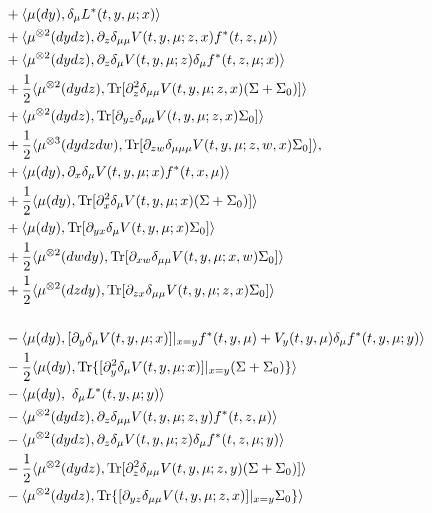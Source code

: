 \documentclass{amsart}
\theoremstyle{definition}
\theoremstyle{remark}
\def\D{\partial}
\numberwithin{equation}{section}
\begin{document}
{\begin{align*}
& + \langle \mu(dy), \delta_\mu L^*(t,y,  \mu;x) \rangle \notag \\
& +\langle \mu^{\otimes2}(dydz), \D_z\delta_{\mu\mu} V(t,y, \mu; z,x) f^*(t, z,\mu)\rangle \notag  \\
&+\langle  \mu^{\otimes2}(dydz), \D_z\delta_\mu V(t,y, \mu; z)\delta_\mu f^*(t, z,\mu;x)\rangle \notag  \\
&\hskip -0cm +\frac{1}{2}\langle  \mu^{\otimes2}(dydz), {\rm Tr}[
\D_{z}^2 \delta_{\mu\mu}
V(t, y, \mu; z,x) (\Sigma+\Sigma_0)]\rangle \notag \\
&+ \langle \mu^{\otimes2}(dydz), {\rm Tr} [ \D_{yz}\delta_{\mu\mu} V(t,y, \mu;z,x)  \Sigma_0]\rangle \notag  \\
&+\frac{1}{2}\langle\mu^{\otimes3}(dydzdw), {\rm Tr}[\D_{zw}\delta_{\mu\mu\mu} V (t, y, \mu; z,w,x)
\Sigma_0]\rangle ,\notag\\
&+\langle\mu(dy), \D_x\delta_\mu V(t,y, \mu; x) f^*(t, x,\mu)\rangle \\
& + \frac{1}{2}\langle\mu(dy), {\rm Tr}[
\D_{x}^2 \delta_\mu
V(t, y, \mu; x) (\Sigma+\Sigma_0)]\rangle \\
&+\langle\mu(dy),  {\rm Tr} [ \D_{yx}\delta_\mu V(t,y, \mu;x)  \Sigma_0 ]\rangle  \\
& + \frac{1}{2}\langle\mu^{\otimes 2}(dwdy), {\rm Tr}[\D_{xw}\delta_{\mu\mu} V (t, y, \mu; x,w)
\Sigma_0]\rangle\\
& + \frac{1}{2}\langle\mu^{\otimes 2}(dzdy), {\rm Tr}[\D_{zx}\delta_{\mu\mu} V (t, y, \mu; z,x)
\Sigma_0]\rangle\\
&\\
 &-\langle\mu(dy),  [\D_{y} \delta_\mu V (t, y, \mu;x)]|_{x=y}
f^*(t,y,  \mu) +    V_y (t, y, \mu)
\delta_\mu f^*(t,y,  \mu;y)\rangle
 \notag \\
&- \frac{1}{2} \langle \mu(dy),  {\rm Tr}
\{[\D_{y}^2\delta_\mu V(t, y, \mu;x)]|_{x=y}(\Sigma+ \Sigma_0  ) \}\rangle \\
& - \langle\mu(dy),\ \delta_\mu L^*(t,y,  \mu;y) \rangle \notag \\
& -\langle \mu^{\otimes2}(dydz), \D_z\delta_{\mu\mu} V(t,y, \mu; z,y) f^*(t, z,\mu)\rangle \notag  \\
&-\langle  \mu^{\otimes2}(dydz), \D_z\delta_\mu V(t,y, \mu; z)\delta_\mu f^*(t, z,\mu;y)\rangle \notag  \\
&-\frac{1}{2}\langle  \mu^{\otimes2}(dydz), {\rm Tr}[
\D_{z}^2 \delta_{\mu\mu}
V(t, y, \mu; z,y) (\Sigma+\Sigma_0)]\rangle \notag \\
&- \langle \mu^{\otimes2}(dydz), {\rm Tr}\{ [ \D_{yz}\delta_{\mu\mu} V(t,y, \mu;z,x)]|_{x=y}  \Sigma_0 \}\rangle \notag  \\

\end{align*}}
\end{document}
